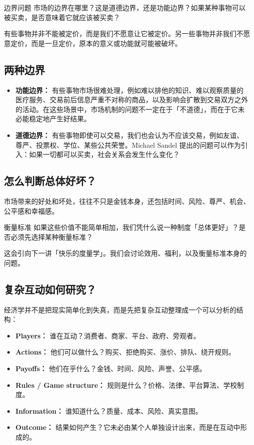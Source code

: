 \documentclass[10pt,a4paper]{ctexart}
\begin{document}
\begin{discussionbox}{边界问题}
市场的边界在哪里？这是道德边界，还是功能边界？如果某种事物可以被买卖，是否意味着它就应该被买卖？
\end{discussionbox}

有些事物并非不能被定价，而是我们不愿意让它被定价。另一些事物并非我们不愿意定价，而是一旦定价，原本的意义或功能就可能被破坏。

\subsection{两种边界}

\begin{itemize}
  \item \textbf{功能边界：} 有些事物市场很难处理，例如难以排他的知识、难以观察质量的医疗服务、交易前后信息严重不对称的商品，以及影响会扩散到交易双方之外的活动。在这些场景中，市场机制的问题不一定在于「不道德」，而在于它未必能稳定地产生好结果。
  \item \textbf{道德边界：} 有些事物即使可以交易，我们也会认为不应该交易，例如友谊、尊严、投票权、学位、某些公共荣誉。Michael Sandel 提出的问题可以作为引入：如果一切都可以买卖，社会关系会发生什么变化？
\end{itemize}

\subsection{怎么判断总体好坏？}

市场带来的好处和坏处，往往不只是金钱本身，还包括时间、风险、尊严、机会、公平感和幸福感。

\begin{discussionbox}{衡量标准}
如果这些价值不能简单相加，我们凭什么说一种制度「总体更好」？是否必须先选择某种衡量标准？
\end{discussionbox}

这会引向下一讲「快乐的度量学」。我们会讨论效用、福利，以及衡量标准本身的问题。

\subsection{复杂互动如何研究？}

经济学并不是把现实简单化到失真，而是先把复杂互动整理成一个可以分析的结构：

\begin{itemize}
  \item \textbf{Players：} 谁在互动？消费者、商家、平台、政府、旁观者。
  \item \textbf{Actions：} 他们可以做什么？购买、拒绝购买、涨价、排队、绕开规则。
  \item \textbf{Payoffs：} 他们在乎什么？金钱、时间、风险、声誉、公平感。
  \item \textbf{Rules / Game structure：} 规则是什么？价格、法律、平台算法、学校制度。
  \item \textbf{Information：} 谁知道什么？质量、成本、风险、真实意图。
  \item \textbf{Outcome：} 结果如何产生？它未必由某个人单独设计出来，而是在互动中形成的。
\end{itemize}
\end{document}
